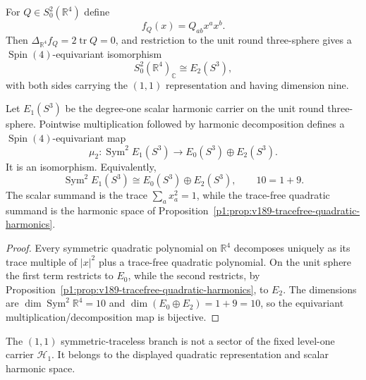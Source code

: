 \documentclass[11pt]{article}
\begin{document}
\begin{proposition}
\label{p1:prop:v189-tracefree-quadratic-harmonics}
For $Q\in S^2_0(\mathbb R^4)$ define
\[
 f_Q(x)=Q_{ab}x^ax^b.
\]
Then $\Delta_{\mathbb R^4}f_Q=2\operatorname{tr}Q=0$, and restriction to the
unit round three-sphere gives a $\operatorname{Spin}(4)$-equivariant isomorphism
\[
 \boxed{S^2_0(\mathbb R^4)_\mathbb C\cong E_2(S^3),}
\]
with both sides carrying the $(1,1)$ representation and having dimension
nine.
\end{proposition}


\begin{corollary}
\label{p1:cor:v191-sym2-e1-e0e2}
Let $E_1(S^3)$ be the degree-one scalar harmonic carrier on the unit round
three-sphere.  Pointwise multiplication followed by harmonic decomposition
defines a $\operatorname{Spin}(4)$-equivariant map
\[
 \mu_2:\operatorname{Sym}^2E_1(S^3)
 \longrightarrow E_0(S^3)\oplus E_2(S^3).
\]
It is an isomorphism.  Equivalently,
\[
 \boxed{\operatorname{Sym}^2E_1(S^3)\cong E_0(S^3)\oplus E_2(S^3),}
 \qquad 10=1+9.
\]
The scalar summand is the trace $\sum_a x_a^2=1$, while the trace-free
quadratic summand is the harmonic space of
Proposition~\ref{p1:prop:v189-tracefree-quadratic-harmonics}.
\end{corollary}

\begin{proof}
Every symmetric quadratic polynomial on $\mathbb R^4$ decomposes uniquely as
its trace multiple of $|x|^2$ plus a trace-free quadratic polynomial.  On the
unit sphere the first term restricts to $E_0$, while the second restricts,
by Proposition~\ref{p1:prop:v189-tracefree-quadratic-harmonics}, to $E_2$.
The dimensions are $\dim\operatorname{Sym}^2\mathbb R^4=10$ and
$\dim(E_0\oplus E_2)=1+9=10$, so the equivariant multiplication/decomposition
map is bijective.
\end{proof}


\begin{corollary}
\label{p1:cor:v189-level-one-shear-exclusion}
The $(1,1)$ symmetric-traceless branch is not a sector of the fixed
level-one carrier $\mathcal H_1$. It belongs to the displayed quadratic
representation and scalar harmonic space.
\end{corollary}
\end{document}
